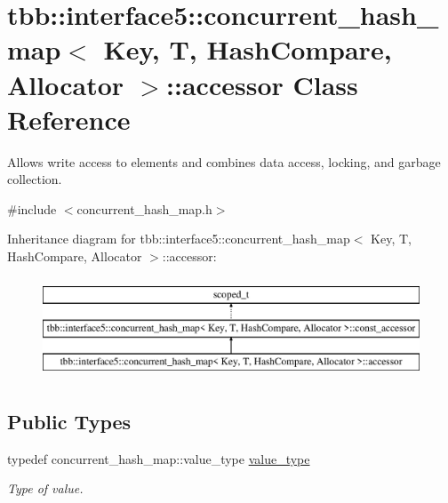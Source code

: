 \hypertarget{classtbb_1_1interface5_1_1concurrent__hash__map_1_1accessor}{}\section{tbb\+:\+:interface5\+:\+:concurrent\+\_\+hash\+\_\+map$<$ Key, T, Hash\+Compare, Allocator $>$\+:\+:accessor Class Reference}
\label{classtbb_1_1interface5_1_1concurrent__hash__map_1_1accessor}


Allows write access to elements and combines data access, locking, and garbage collection.  




{\ttfamily \#include $<$concurrent\+\_\+hash\+\_\+map.\+h$>$}

Inheritance diagram for tbb\+:\+:interface5\+:\+:concurrent\+\_\+hash\+\_\+map$<$ Key, T, Hash\+Compare, Allocator $>$\+:\+:accessor\+:\begin{figure}[H]
\begin{center}
\leavevmode
\includegraphics[height=3.000000cm]{classtbb_1_1interface5_1_1concurrent__hash__map_1_1accessor}
\end{center}
\end{figure}
\subsection*{Public Types}
\begin{DoxyCompactItemize}
\item 
\hypertarget{classtbb_1_1interface5_1_1concurrent__hash__map_1_1accessor_af81d94952ed35f1bf79423cd867119aa}{}typedef concurrent\+\_\+hash\+\_\+map\+::value\+\_\+type \hyperlink{classtbb_1_1interface5_1_1concurrent__hash__map_1_1accessor_af81d94952ed35f1bf79423cd867119aa}{value\+\_\+type}\label{classtbb_1_1interface5_1_1concurrent__hash__map_1_1accessor_af81d94952ed35f1bf79423cd867119aa}

\begin{DoxyCompactList}\small\item\em Type of value. \end{DoxyCompactList}\end{DoxyCompactItemize}

